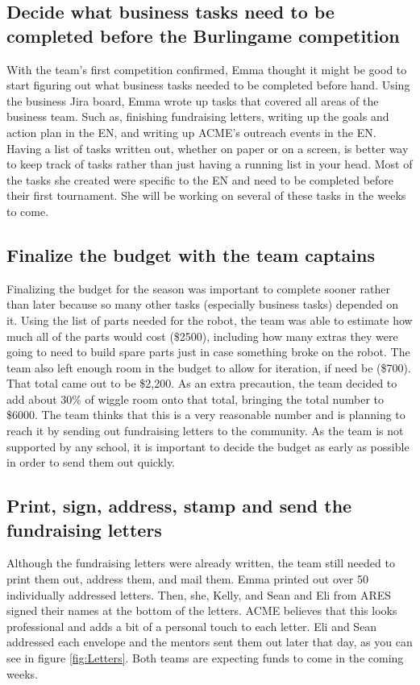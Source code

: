 \documentclass{article}
\newif\ifcontents
\begin{document}
\contentsfalse
\subsection{Decide what business tasks need to be completed before the Burlingame competition}
With the team's first competition confirmed, Emma thought it might be good to start figuring out what business tasks needed to be completed before hand. Using the business Jira board, Emma wrote up tasks that covered all areas of the business team. Such as, finishing fundraising letters, writing up the goals and action plan in the EN, and writing up ACME's outreach events in the EN. Having a list of tasks written out, whether on paper or on a screen, is better way to keep track of tasks rather than just having a running list in your head. Most of the tasks she created were specific to the EN and need to be completed before their first tournament. She will be working on several of these tasks in the weeks to come.

\subsection{Finalize the budget with the team captains}
Finalizing the budget for the season was important to complete sooner rather than later because so many other tasks (especially business tasks) depended on it. Using the list of parts needed for the robot, the team was able to estimate how much all of the parts would cost (\$2500), including how many extras they were going to need to build spare parts just in case something broke on the robot. The team also left enough room in the budget to allow for iteration, if need be (\$700). That total came out to be \$2,200. As an extra precaution, the team decided to add about 30\% of wiggle room onto that total, bringing the total number to \$6000. The team thinks that this is a very reasonable number and is planning to reach it by sending out fundraising letters to the community. As the team is not supported by any school, it is important to decide the budget as early as possible in order to send them out quickly.

\subsection{Print, sign, address, stamp and send the fundraising letters}
Although the fundraising letters were already written, the team still needed to print them out, address them, and mail them. Emma printed out over 50 individually addressed letters. Then, she, Kelly, and Sean and Eli from ARES signed their names at the bottom of the letters. ACME believes that this looks professional and adds a bit of a personal touch to each letter.  Eli and Sean addressed each envelope and the mentors sent them out later that day, as you can see in figure \ref{fig:Letters}. Both teams are expecting funds to come in the coming weeks. 
\end{document}
